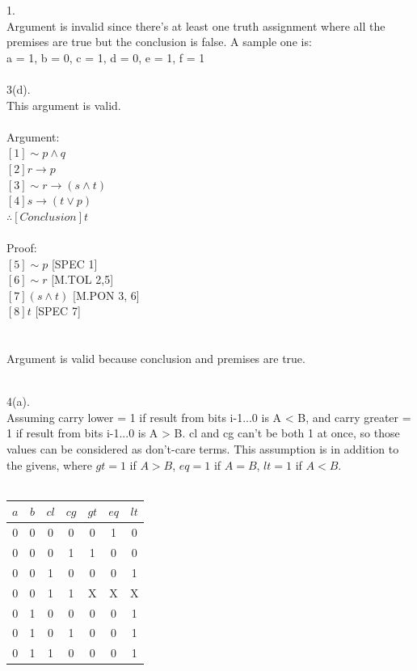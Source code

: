 \documentclass[a4paper, 20pt]{article}
\def\lnot{\mathop{\sim}}
\begin{document}
\begin{question}{1.}
\\ Argument is invalid since there's at least one truth assignment where all the premises are true but the conclusion is false. A sample one is:
\\ a = 1, b = 0, c = 1, d = 0, e = 1, f = 1
\\
\\3(d).
\\This argument is valid.
\\
\\ Argument:\\
$[1]\lnot p \land q$\\
$[2]r \rightarrow p$\\
$[3]\lnot r \rightarrow (s \land t)$\\
$[4]s \rightarrow (t \lor p)$\\
$\therefore [Conclusion] t  $\\
\\ Proof:
\\ $[5] \lnot p$ [SPEC 1]
\\ $[6] \lnot r$ [M.TOL 2,5]
\\ $[7] (s \land t)$ [M.PON 3, 6]
\\ $[8] t$ [SPEC 7]
\\ \boxed{}
\\
\\ Argument is valid because conclusion and premises are true.
\newpage

\newpage
\\4(a).
\\ Assuming carry lower = 1 if result from bits i-1...0 is A < B, and carry greater = 1 if result from bits i-1...0 is A > B. cl and cg can't be both 1 at once, so those values can be considered as don't-care terms. This assumption is in addition to the givens, where $gt=1$ if $A>B$, $eq=1$ if $A=B$, $lt=1$ if $A<B$.
\\
\\
\begin{tabular}{c c c c | c c c}
    $a$ & $b$ & $cl$ & $cg$ & $gt$ & $eq$ & $lt$ \\
    \hline
    0 & 0 & 0 & 0 & 0 & 1 & 0 \\
    0 & 0 & 0 & 1 & 1 & 0 & 0 \\
    0 & 0 & 1 & 0 & 0 & 0 & 1 \\
    0 & 0 & 1 & 1 & X & X & X \\
    \hline
    0 & 1 & 0 & 0 & 0 & 0 & 1 \\
    0 & 1 & 0 & 1 & 0 & 0 & 1 \\
    0 & 1 & 1 & 0 & 0 & 0 & 1 \\

\end{tabular}
\end{question}
\end{document}
